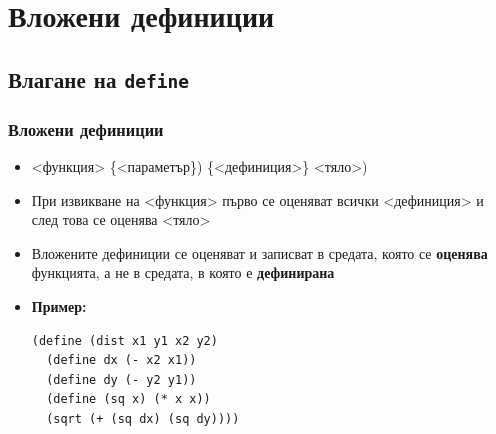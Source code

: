 \documentclass{beamer}
\begin{document}
\section{Вложени дефиниции}



\subsection{Влагане на \tt{define}}

\begin{frame}[fragile]
  \frametitle{Вложени дефиниции}

  \begin{itemize}[<+->]
  \item {}<функция> \{<параметър\}\tta) \{<дефиниция>\} <тяло>\tta)
  \item При извикване на <функция> първо се оценяват всички <дефиниция> и след това се оценява <тяло>
  \item Вложените дефиниции се оценяват и записват в средата, която се \textbf{оценява} функцията, а не в средата, в която е \textbf{дефинирана}
  \item \textbf{Пример:}\\
\begin{lstlisting}
(define (dist x1 y1 x2 y2)
  (define dx (- x2 x1))
  (define dy (- y2 y1))
  (define (sq x) (* x x))
  (sqrt (+ (sq dx) (sq dy))))
\end{lstlisting}
  \end{itemize}
\end{frame}
\end{document}
